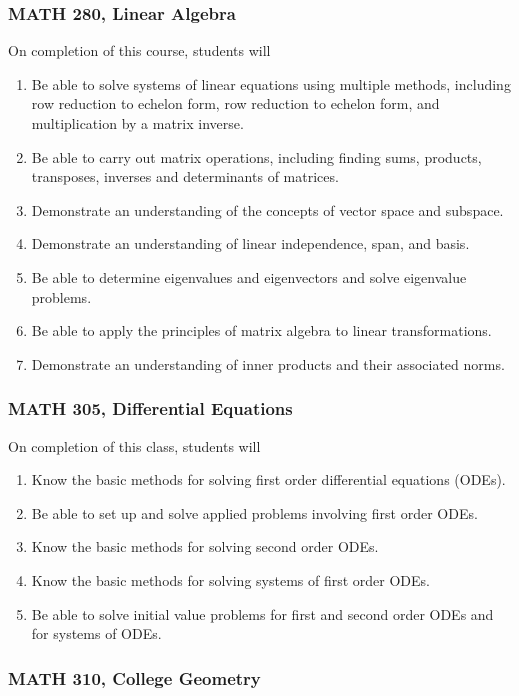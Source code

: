 \documentclass[11pt]{article}
\newenvironment{alphalist}{
\begin{enumerate}[label=(\arabic*),widest=107 ,leftmargin=25pt, itemsep=0pt]}
{\end{enumerate}}
\begin{document}
\subsubsection*{MATH 280, Linear Algebra}
On completion of this course, students will
\begin{alphalist}
\item Be able to solve systems of linear equations using multiple methods, including row reduction to echelon form, row reduction to echelon form, and multiplication by a matrix inverse.
\item Be able to carry out matrix operations, including finding sums, products, transposes, inverses and determinants of matrices.
\item Demonstrate an understanding of the concepts of vector space and subspace.
\item Demonstrate an understanding of linear independence, span, and basis.
\item Be able to determine eigenvalues and eigenvectors and solve eigenvalue problems.
\item Be able to apply the principles of matrix algebra to linear transformations.
\item Demonstrate an understanding of inner products and their associated norms.
\end{alphalist} 


\subsubsection*{MATH 305, Differential Equations}

On completion of this class, students will
\begin{alphalist}
    \item Know the basic methods for solving first order differential equations (ODEs).
    \item Be able to set up and solve applied problems involving first order ODEs.
    \item Know the basic methods for solving second order ODEs.
    \item Know the basic methods for solving systems of first order ODEs.
    \item Be able to solve initial value problems for first and second order ODEs and for systems of ODEs.
\end{alphalist}

\subsubsection*{MATH 310, College Geometry}
\end{document}
